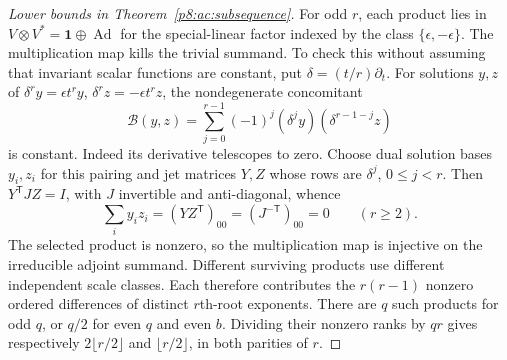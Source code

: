 \documentclass[11pt,a4paper]{article}
\theoremstyle{definition}
\theoremstyle{remark}
\numberwithin{equation}{section}
\begin{document}
\begin{proof}[Lower bounds in Theorem~\ref{p8:ac:subsequence}]
For odd $r$, each product lies in
$V\otimes V^*=\mathbf1\oplus\operatorname{Ad}$ for the special-linear
factor indexed by the class $\{\epsilon,-\epsilon\}$.
The multiplication map kills the trivial summand. To check this
without assuming that invariant scalar functions are constant, put
$\delta=(t/r)\partial_t$. For solutions $y,z$ of
$\delta^r y=\epsilon t^r y$, $\delta^r z=-\epsilon t^r z$, the
nondegenerate concomitant
\[
 \mathcal B(y,z)=\sum_{j=0}^{r-1}(-1)^j
                  (\delta^j y)(\delta^{r-1-j}z)
\]
is constant. Indeed its derivative telescopes to zero.
Choose dual solution bases $y_i,z_i$ for this pairing and jet matrices
$Y,Z$ whose rows are $\delta^j$, $0\le j<r$. Then
$Y^{\mathsf T}JZ=I$, with $J$ invertible and anti-diagonal, whence
\[
 \sum_i y_i z_i=(YZ^{\mathsf T})_{00}=(J^{-\mathsf T})_{00}=0
 \qquad(r\ge2).
\]
The selected product is nonzero, so the multiplication map is
injective on the irreducible adjoint summand. Different surviving
products use different independent scale classes. Each therefore
contributes the $r(r-1)$ nonzero ordered differences of distinct
$r$th-root exponents. There are $q$ such products for odd $q$, or
$q/2$ for even $q$ and even $b$. Dividing their nonzero ranks by $qr$
gives respectively $2\lfloor r/2\rfloor$ and
$\lfloor r/2\rfloor$, in both parities of $r$.
\end{proof}
\end{document}
